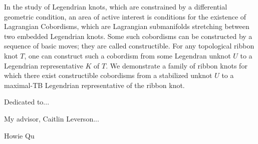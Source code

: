 \documentclass[11pt,twoside,reqno]{book}
\begin{document}

\abstr


In the study of Legendrian knots, which are constrained by a differential geometric condition, an area of active interest is conditions for the existence of Lagrangian Cobordisms, which are Lagrangian submanifolds stretching between two embedded Legendrian knots.
Some such cobordisms can be constructed by a sequence of basic moves; they are called constructible.
For any topological ribbon knot $T$, one can construct such a cobordism from some Legendran unknot $U$ to a Legendrian representative $K$ of $T$.
We demonstrate a family of ribbon knots for which there exist constructible cobordisms from a stabilized unknot $U$ to a maximal-TB Legendrian representative of the ribbon knot.

\dedic

Dedicated to...

\acknowl

My advisor, Caitlin Leverson...

Howie Qu

\tableofcontents

\startmain









\begin{appendices}

    

\end{appendices}

\printbibliography[heading=bibintoc]
\end{document}
